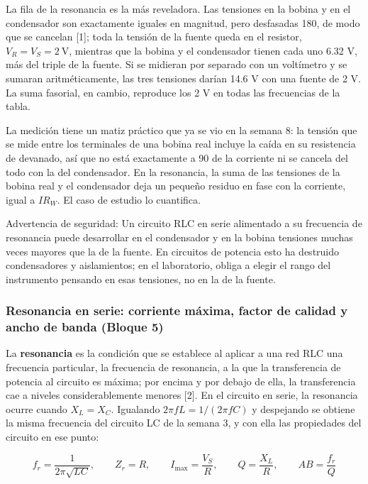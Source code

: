 \documentclass[11pt,letterpaper]{article}
\begin{document}
La fila de la resonancia es la más reveladora. Las tensiones en la bobina y en el condensador son exactamente iguales en magnitud, pero desfasadas 180\textdegree{}, de modo que se cancelan [1]; toda la tensión de la fuente queda en el resistor, $V_R = V_S = 2\ \text{V}$, mientras que la bobina y el condensador tienen cada uno 6.32 V, más del triple de la fuente. Si se midieran por separado con un voltímetro y se sumaran aritméticamente, las tres tensiones darían 14.6 V con una fuente de 2 V. La suma fasorial, en cambio, reproduce los 2 V en todas las frecuencias de la tabla.

La medición tiene un matiz práctico que ya se vio en la semana 8: la tensión que se mide entre los terminales de una bobina real incluye la caída en su resistencia de devanado, así que no está exactamente a 90\textdegree{} de la corriente ni se cancela del todo con la del condensador. En la resonancia, la suma de las tensiones de la bobina real y el condensador deja un pequeño residuo en fase con la corriente, igual a $I R_W$. El caso de estudio lo cuantifica.

\begin{nota}{Advertencia de seguridad:}
Un circuito RLC en serie alimentado a su frecuencia de resonancia puede desarrollar en el condensador y en la bobina tensiones muchas veces mayores que la de la fuente. En circuitos de potencia esto ha destruido condensadores y aislamientos; en el laboratorio, obliga a elegir el rango del instrumento pensando en esas tensiones, no en la de la fuente.
\end{nota}

\subsubsection{Resonancia en serie: corriente máxima, factor de calidad y ancho de banda (Bloque 5)}

La \textbf{resonancia} es la condición que se establece al aplicar a una red RLC una frecuencia particular, la frecuencia de resonancia, a la que la transferencia de potencia al circuito es máxima; por encima y por debajo de ella, la transferencia cae a niveles considerablemente menores [2]. En el circuito en serie, la resonancia ocurre cuando $X_L = X_C$. Igualando $2\pi f L = 1/(2\pi f C)$ y despejando se obtiene la misma frecuencia del circuito LC de la semana 3, y con ella las propiedades del circuito en ese punto:

\begin{equation}
  f_r = \frac{1}{2\pi\sqrt{LC}}, \qquad Z_r = R, \qquad I_{\mathrm{max}} = \frac{V_S}{R}, \qquad Q = \frac{X_L}{R}, \qquad AB = \frac{f_r}{Q}
\end{equation}
\end{document}
